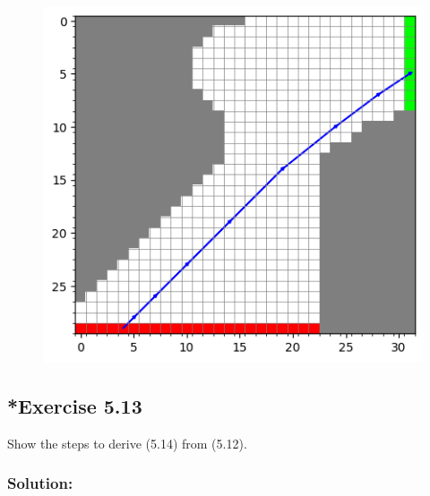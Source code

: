 \begin{figure}[H]
\begin{minipage}[b]{0.35\textwidth}
    \end{minipage}
    \hspace{0.05\textwidth} %
    \begin{minipage}[b]{0.45\textwidth}
      \centering
      \includegraphics[width=\textwidth]{chapters_latex/figures/ex_05_12_2.png}
    \end{minipage}
  \end{figure}

\subsection*{*Exercise 5.13}
Show the steps to derive (5.14) from (5.12).

\subsubsection*{Solution:}

